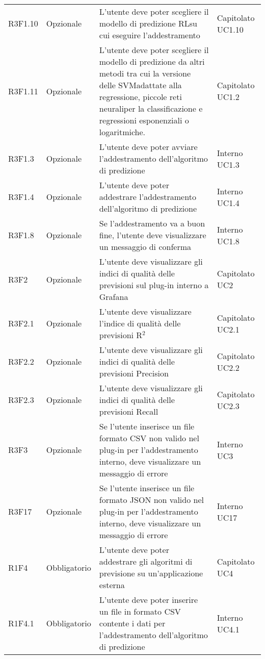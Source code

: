 \begin{longtable} {
		>{}p{24mm} 
		>{}p{32mm}
		>{}p{40mm} 
		>{}p{24.5mm}
		}
		R3F1.10 & Opzionale & L'utente deve poter scegliere il modello di predizione RL\glosp su cui eseguire l'addestramento & Capitolato UC1.10 \TBstrut \\ [2mm]
		R3F1.11 & Opzionale & L'utente deve poter scegliere il modello di predizione da altri metodi tra cui la versione delle SVM\glosp adattate alla regressione, piccole reti neurali\glosp per la classificazione e regressioni esponenziali o logaritmiche. & Capitolato UC1.2 \TBstrut \\
		R3F1.3 & Opzionale & L'utente deve poter avviare l'addestramento dell'algoritmo di predizione & Interno UC1.3 \TBstrut \\ [2mm]
		R3F1.4 & Opzionale & L'utente deve poter addestrare l'addestramento dell'algoritmo di predizione & Interno UC1.4 \TBstrut \\ [2mm]
		R3F1.8 & Opzionale & Se l'addestramento va a buon fine, l'utente deve visualizzare un messaggio di conferma & Interno UC1.8 \TBstrut \\ [2mm]		
		R3F2 & Opzionale & L'utente deve visualizzare gli indici di qualità delle previsioni sul plug-in interno a Grafana\glosp & Capitolato UC2 \TBstrut \\ [2mm]
		R3F2.1 & Opzionale & L'utente deve visualizzare l'indice di qualità delle previsioni R$^{2}$\glo & Capitolato UC2.1 \TBstrut \\ [2mm]
		R3F2.2 & Opzionale & L'utente deve visualizzare gli indici di qualità delle previsioni Precision & Capitolato UC2.2 \TBstrut \\ [2mm]
		R3F2.3 & Opzionale & L'utente deve visualizzare gli indici di qualità delle previsioni Recall & Capitolato UC2.3 \TBstrut \\ [2mm]
		R3F3 & Opzionale & Se l'utente inserisce un file formato CSV non valido nel plug-in per l'addestramento interno, deve visualizzare un messaggio di errore & Interno UC3 \TBstrut \\ [2mm]
		R3F17 & Opzionale & Se l'utente inserisce un file formato JSON non valido nel plug-in per l'addestramento interno, deve visualizzare un messaggio di errore & Interno UC17 \TBstrut \\ [2mm]	
		R1F4 & Obbligatorio & L'utente deve poter addestrare gli algoritmi di previsione su un'applicazione esterna & Capitolato UC4 \TBstrut \\ [2mm]		
		R1F4.1 & Obbligatorio & L'utente deve poter inserire un file in formato CSV contente i dati per l'addestramento dell'algoritmo di predizione & Interno UC4.1 \TBstrut \\ [2mm]		

\end{longtable}
